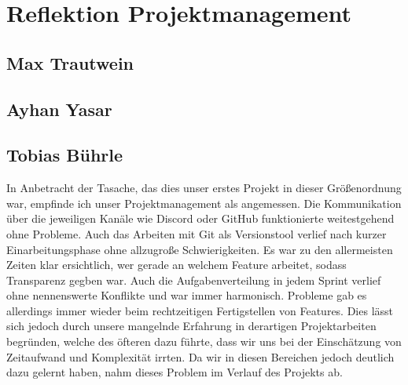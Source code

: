 \chapter{Reflektion Projektmanagement}\label{ch:reflektion-projektmanagement}


\section{Max Trautwein}


\section{Ayhan Yasar}


\section{Tobias Bührle}
In Anbetracht der Tasache, das dies unser erstes Projekt in dieser Größenordnung war, 
empfinde ich unser Projektmanagement als angemessen. Die Kommunikation über die jeweiligen 
Kanäle wie Discord oder GitHub funktionierte weitestgehend ohne Probleme. Auch das 
Arbeiten mit Git als Versionstool verlief nach kurzer Einarbeitungsphase ohne allzugroße 
Schwierigkeiten. Es war zu den allermeisten Zeiten klar ersichtlich, wer gerade an welchem 
Feature arbeitet, sodass Transparenz gegben war. Auch die Aufgabenverteilung in jedem 
Sprint verlief ohne nennenswerte Konflikte und war immer harmonisch. Probleme gab es 
allerdings immer wieder beim rechtzeitigen Fertigstellen von Features. Dies lässt sich 
jedoch durch unsere mangelnde Erfahrung in derartigen Projektarbeiten begründen, welche 
des öfteren dazu führte, dass wir uns bei der Einschätzung von Zeitaufwand und Komplexität 
irrten. Da wir in diesen Bereichen jedoch deutlich dazu gelernt haben, nahm dieses Problem 
im Verlauf des Projekts ab.

